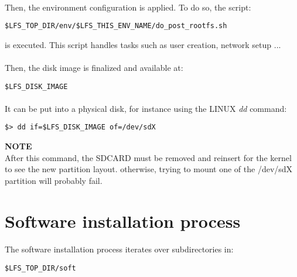 \documentclass[a4paper, 11pt]{article}
\begin{document}
\paragraph{}
Then, the environment configuration is applied. To do so, the script:\\

\begin{lstlisting}[frame=tb]
$LFS_TOP_DIR/env/$LFS_THIS_ENV_NAME/do_post_rootfs.sh
\end{lstlisting}
is executed. This script handles tasks such as user creation, network setup ...

\paragraph{}
Then, the disk image is finalized and available at:\\

\begin{lstlisting}[frame=tb]
$LFS_DISK_IMAGE
\end{lstlisting}

\paragraph{}
It can be put into a physical disk, for instance using the LINUX \textit{dd}
command:\\

\begin{lstlisting}[frame=tb]
$> dd if=$LFS_DISK_IMAGE of=/dev/sdX
\end{lstlisting}
\textbf{NOTE}\\
After this command, the SDCARD must be removed and reinsert for the kernel to
see the new partition layout. otherwise, trying to mount one of the /dev/sdX
partition will probably fail.


\clearpage
\section{Software installation process}
\paragraph{}
The software installation process iterates over subdirectories in:\\

\begin{lstlisting}[frame=tb]
$LFS_TOP_DIR/soft
\end{lstlisting}
\end{document}
